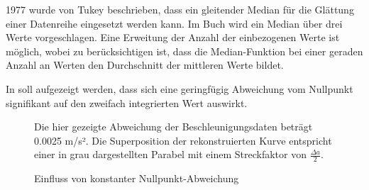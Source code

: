 1977 wurde von Tukey beschrieben, dass ein gleitender Median für die Glättung einer Datenreihe eingesetzt werden kann. %
Im Buch wird ein Median über drei Werte vorgeschlagen. Eine Erweitung der Anzahl der einbezogenen Werte ist möglich, wobei zu berücksichtigen ist, dass die Median-Funktion bei einer geraden Anzahl an Werten den Durchschnitt der mittleren Werte bildet.


\FloatBarrier
{}
In  soll aufgezeigt werden, dass sich eine geringfügig Abweichung vom Nullpunkt signifikant auf den zweifach integrierten Wert auswirkt.

\begin{figure}[ht!]
\vspace{0.25cm}
\begin{center}
\caption{Einfluss von konstanter Nullpunkt-Abweichung}
\label{fig:SzeneOffset}
\end{center}

\vspace{0.25cm}
Die hier gezeigte Abweichung der Beschleunigungsdaten beträgt 0.0025 m/s². Die Superposition der rekonstruierten Kurve entspricht einer in grau dargestellten Parabel mit einem Streckfaktor von $\frac{\Delta a}{2}$.
\end{figure}


